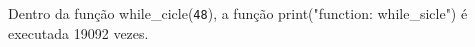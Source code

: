 \documentclass[12pt,varwidth=16cm,border=1pt]{standalone}
\begin{document}
Dentro da função while\_cicle(\verb+48+), a função print("function: while\_sicle") é executada 19092 vezes.

\questiomfalse
\end{document}
